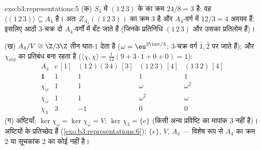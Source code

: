 \begin{solution}{exo:b3:representations:5}
(क) $S_4$ में $(1\,2\,3)$ के  का क्रम $24/8 =
3$ है: वह $\langle(1\,2\,3)\rangle \subseteq A_4$ है। अतः $Z_{A_4}((1\,2\,3))$
का क्रम $3$ है और $A_4$-वर्ग में $12/3
= 4$ अवयव हैं: इसलिए आठों $3$-चक्र
दो $A_4$-वर्गों में बँट जाते हैं (जिनके प्रतिनिधि $(1\,2\,3)$ और उसका
प्रतिलोम हैं)।

(ख) $A_4/V \cong \Z/3\Z$ तीन घात-$1$  देता है ($\omega = \eu^{2\iu\pi/3}$; $3$-चक्र वर्ग $\bar1, \bar2$
पर जाते हैं); और $\chi_{\mathrm{std}}$ का प्रतिबंध  बना रहता है ($\langle\chi,\chi\rangle = \frac1{12}(9 + 3
\cdot 1 + 0 + 0) = 1$):
\[
\begin{array}{c|cccc}
A_4 & e\,[1] & (1\,2)(3\,4)\,[3] & (1\,2\,3)\,[4] &
(1\,3\,2)\,[4]\\
\hline
\mathbf 1 & 1 & 1 & 1 & 1\\
\chi_\omega & 1 & 1 & \omega & \omega^2\\
\chi_{\bar\omega} & 1 & 1 & \omega^2 & \omega\\
\chi_3 & 3 & -1 & 0 & 0
\end{array}
\]
(ग) अष्टियाँ: $\ker\chi_\omega = \ker\chi_{\bar\omega} = V$; $\ker\chi_3 = \{e\}$ (किसी अन्य प्रविष्टि का मापांक $3$
नहीं है)।  अष्टियों के प्रतिच्छेद हैं (\cref{exo:b3:representations:6}):
$\{e\}$, $V$, $A_4$ --- विशेष रूप से $A_4$ का क्रम $2$ या सूचकांक
$2$ का कोई  नहीं है।
\end{solution}

